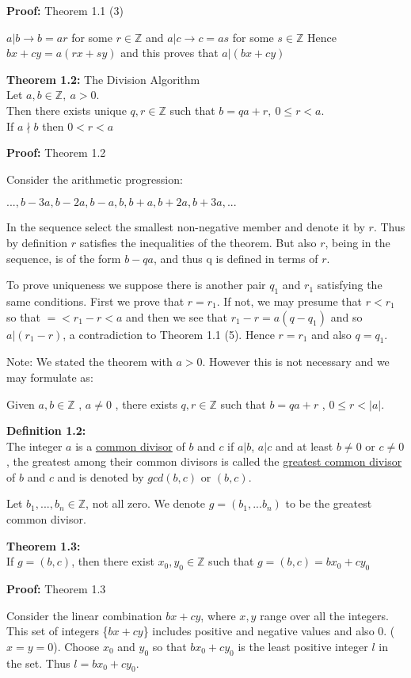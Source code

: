 \documentclass[a4paper]{article}
\begin{document}
\textbf{Proof:} Theorem 1.1 (3)

$a|b \rightarrow b=ar$ for some $r\in \mathbb{Z}$
and $a|c \rightarrow c=as$ for some $s\in \mathbb{Z}$
Hence $bx+cy=a(rx+sy)$ and this proves that $a|(bx+cy)$


\textbf{Theorem 1.2:} The Division Algorithm\\
Let $a,b\in\mathbb{Z},\ a>0$.\\
Then there exists unique $q,r\in\mathbb{Z}$ such that $b=qa+r,\ 0\leq r<a$.\\
If $a\nmid b$ then $0<r<a$

\textbf{Proof:} Theorem 1.2

Consider the arithmetic progression:

$...,b-3a,b-2a,b-a,b,b+a,b+2a,b+3a,...$

In the sequence select the smallest non-negative member and denote it by
$r$. Thus by definition $r$ satisfies the inequalities of the theorem. But
also $r$, being in the sequence, is of the form $b-qa$, and thus q is defined
in terms of $r$.

To prove uniqueness we suppose there is another pair $q_1$ and $r_1$ satisfying
the same conditions. First we prove that $r=r_1$. If not, we may presume
that $r<r_1$ so that $=<r_1-r<a$ and then we see that $r_1-r=a(q-q_1)$ and
so $a|(r_1-r)$, a contradiction to Theorem 1.1 (5). Hence $r=r_1$ and also
$q=q_1$.

Note: We stated the theorem with $a>0$. However this is not necessary and
we may formulate as:

Given $a,b\in\mathbb{Z}$ , $a\neq 0$ , there exists $q,r\in\mathbb{Z}$ such
that $b=qa+r$ , $0\leq r < |a|$.


\textbf{Definition 1.2:}\\
The integer $a$ is a \underline{common divisor} of $b$ and $c$ if $a|b$,
$a|c$
and at least $b\neq0$ or $c\neq0$, the greatest among their common divisors
is
called the \underline{greatest common divisor} of $b$ and $c$ and is denoted
by
$gcd(b,c)$ or $(b,c)$.

Let $b_1,...,b_n\in\mathbb{Z}$, not all zero.
We denote $g=(b_1,...b_n)$ to be the greatest common divisor.

\textbf{Theorem 1.3:}\\
If $g=(b,c)$, then there exist $x_0,y_0\in\mathbb{Z}$ such that $g=(b,c)=bx_0+cy_0$

\textbf{Proof:} Theorem 1.3

Consider the linear combination $bx+cy$, where $x,y$ range over all the integers.
This set of integers \{$bx+cy$\} includes positive and negative values and
also 0. ($x=y=0$). Choose $x_0$ and $y_0$ so that $bx_0+cy_0$ is the least
positive integer $l$ in the set. Thus $l=bx_0+cy_0$.
\end{document}
